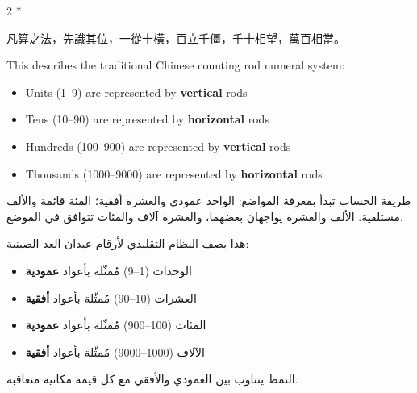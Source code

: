 \documentclass[11pt,a4paper]{article}
\newcommand{\ar}[1]{\arabicfont\beginR #1\endR}
\newcommand{\zh}[1]{{\CJKfamily{}#1}}
\begin{document}
\begin{paracol}{2}
\switchcolumn[0]*\noindent
\begin{tcolorbox}[colback=chinesebg,colframe=rulecolor,boxrule=0.5pt,left=6pt,right=6pt,top=4pt,bottom=4pt]
\zh{凡算之法，先識其位，一從十橫，百立千僵，千十相望，萬百相當。}
\end{tcolorbox}

\vspace{3pt}
This describes the traditional Chinese counting rod numeral system:
\begin{itemize}[leftmargin=1.5em,itemsep=1pt]
  \item Units (1--9) are represented by \textbf{vertical} rods
  \item Tens (10--90) are represented by \textbf{horizontal} rods
  \item Hundreds (100--900) are represented by \textbf{vertical} rods
  \item Thousands (1000--9000) are represented by \textbf{horizontal} rods
\end{itemize}

\switchcolumn
\begin{tcolorbox}[colback=arabicbg,colframe=rulecolor!70!green,boxrule=0.5pt,left=6pt,right=6pt,top=4pt,bottom=4pt]
\arabicfont\raggedleft
طريقة الحساب تبدأ بمعرفة المواضع: الواحد عمودي والعشرة أفقية؛ المئة قائمة والألف مستلقية. الألف والعشرة يواجهان بعضهما، والعشرة آلاف والمئات تتوافق في الموضع.
\end{tcolorbox}

\vspace{3pt}
\ar{هذا يصف النظام التقليدي لأرقام عيدان العد الصينية:}
\begin{itemize}[leftmargin=1.5em,itemsep=1pt]
  \item \ar{الوحدات (1–9) مُمثّلة بأعواد \textbf{عمودية}}
  \item \ar{العشرات (10–90) مُمثّلة بأعواد \textbf{أفقية}}
  \item \ar{المئات (100–900) مُمثّلة بأعواد \textbf{عمودية}}
  \item \ar{الآلاف (1000–9000) مُمثّلة بأعواد \textbf{أفقية}}
\end{itemize}
\ar{النمط يتناوب بين العمودي والأفقي مع كل قيمة مكانية متعاقبة.}
\end{paracol}

\newpage

\end{document}
